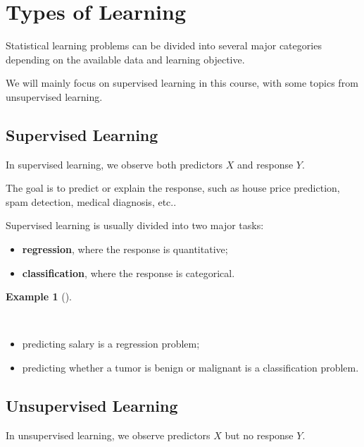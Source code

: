 \documentclass[
  letterpaper,
  DIV=11,
  numbers=noendperiod]{scrreprt}
\providecommand{\tightlist}{%
  \setlength{\itemsep}{0pt}\setlength{\parskip}{0pt}}
\theoremstyle{definition}
\theoremstyle{definition}
\newtheorem{example}{Example}[chapter]
\theoremstyle{plain}
\theoremstyle{plain}
\theoremstyle{remark}
\begin{document}
\section{Types of Learning}\label{types-of-learning}

Statistical learning problems can be divided into several major
categories depending on the available data and learning objective.

We will mainly focus on supervised learning in this course, with some
topics from unsupervised learning.

\subsection{Supervised Learning}\label{supervised-learning}

In supervised learning, we observe both predictors \(X\) and response
\(Y\).

The goal is to predict or explain the response, such as house price
prediction, spam detection, medical diagnosis, etc..

Supervised learning is usually divided into two major tasks:

\begin{itemize}
\tightlist
\item
  \textbf{regression}, where the response is quantitative;
\item
  \textbf{classification}, where the response is categorical.
\end{itemize}

\begin{example}[]\protect\hypertarget{exm-}{}\label{exm-}

~

\begin{itemize}
\tightlist
\item
  predicting salary is a regression problem;
\item
  predicting whether a tumor is benign or malignant is a classification
  problem.
\end{itemize}

\end{example}

\subsection{Unsupervised Learning}\label{unsupervised-learning}

In unsupervised learning, we observe predictors \(X\) but no response
\(Y\).
\end{document}

